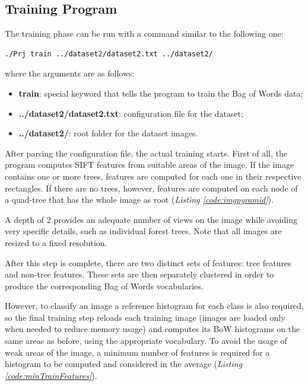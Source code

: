 \documentclass{article}
\begin{document}
\subsection{Training Program}
The training phase can be run with a command similar to the following one:
\begin{lstlisting}[style=CommandLine]
./Prj train ../dataset2/dataset2.txt ../dataset2/
\end{lstlisting}
where the arguments are as follows:
\begin{itemize}
\item \textbf{train}: special keyword that tells the program to train the Bag of Words data;
\item \textbf{../dataset2/dataset2.txt}: configuration file for the dataset;
\item \textbf{../dataset2/}: root folder for the dataset images.
\end{itemize}

After parsing the configuration file, the actual training starts.
First of all, the program computes SIFT features from suitable areas of the image. If the image contains one or more trees, features are computed for each one in their respective rectangles. 
If there are no trees, however, features are computed on each node of a quad-tree that has the whole image as root (\textit{Listing \ref{code:imgpyramid}}). 



A depth of 2 provides an adequate number of views on the image while avoiding very specific details, such as individual forest trees.
Note that all images are resized to a fixed resolution.

After this step is complete, there are two distinct sets of features: tree features and non-tree features.
These sets are then separately clustered in order to produce the corresponding Bag of Words vocabularies.

However, to classify an image a reference histogram for each class is also required, so the final training step reloads each training image (images are loaded only when needed to reduce memory usage) and computes its BoW histograms on the same areas as before, using the appropriate vocabulary.
To avoid the usage of weak areas of the image, a minimum number of features is required for a histogram to be computed and considered in the average (\textit{Listing \ref{code:minTrainFeatures}}).
\end{document}
